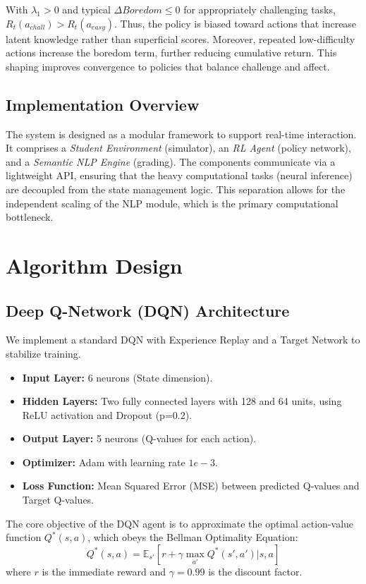 \documentclass[conference]{IEEEtran}
\begin{document}
With $\lambda_1 > 0$ and typical $\Delta Boredom \leq 0$ for appropriately challenging tasks, $R_t(a_{chall}) > R_t(a_{easy})$. Thus, the policy is biased toward actions that increase latent knowledge rather than superficial scores. Moreover, repeated low-difficulty actions increase the boredom term, further reducing cumulative return. This shaping improves convergence to policies that balance challenge and affect.

\subsection{Implementation Overview}
The system is designed as a modular framework to support real-time interaction. It comprises a \textit{Student Environment} (simulator), an \textit{RL Agent} (policy network), and a \textit{Semantic NLP Engine} (grading). The components communicate via a lightweight API, ensuring that the heavy computational tasks (neural inference) are decoupled from the state management logic. This separation allows for the independent scaling of the NLP module, which is the primary computational bottleneck.

\section{Algorithm Design}

\subsection{Deep Q-Network (DQN) Architecture}
We implement a standard DQN with Experience Replay and a Target Network to stabilize training.
\begin{itemize}
    \item \textbf{Input Layer:} 6 neurons (State dimension).
    \item \textbf{Hidden Layers:} Two fully connected layers with 128 and 64 units, using ReLU activation and Dropout (p=0.2).
    \item \textbf{Output Layer:} 5 neurons (Q-values for each action).
    \item \textbf{Optimizer:} Adam with learning rate $1e-3$.
    \item \textbf{Loss Function:} Mean Squared Error (MSE) between predicted Q-values and Target Q-values.
\end{itemize}

The core objective of the DQN agent is to approximate the optimal action-value function $Q^*(s, a)$, which obeys the Bellman Optimality Equation:
\begin{equation}
Q^*(s, a) = \mathbb{E}_{s'} [r + \gamma \max_{a'} Q^*(s', a') | s, a]
\end{equation}
where $r$ is the immediate reward and $\gamma = 0.99$ is the discount factor.
\end{document}
